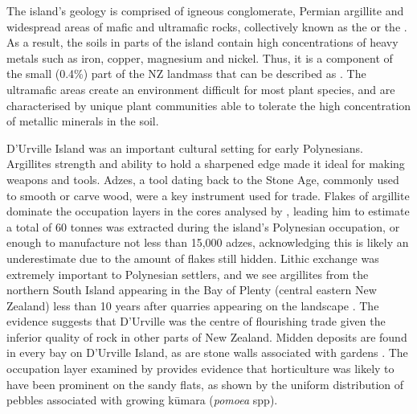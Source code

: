 \documentclass{article}
\begin{document}
The island's geology is comprised of igneous conglomerate, Permian argillite and widespread areas of mafic and ultramafic rocks, collectively known as the  \citep{walls} or the  \citep{lee1992new}.  As a result, the soils in parts of the island contain high concentrations of heavy metals such as iron, copper, magnesium and nickel.  Thus, it is a component of the small (0.4\%) part of the NZ landmass that can be described as  \citep{lee1992new}.  The ultramafic areas create an environment difficult for most plant species, and are characterised by unique plant communities able to tolerate the high concentration of metallic minerals in the soil.  

D'Urville Island was an important cultural setting for early Polynesians.  Argillites strength and ability to hold a sharpened edge made it ideal for making weapons and tools.  Adzes, a tool dating back to the Stone Age, commonly used to smooth or carve wood, were a key instrument used for trade.  Flakes of argillite dominate the occupation layers in the cores analysed by \cite{Wellman1962}, leading him to estimate a total of 60 tonnes was extracted during the island's Polynesian occupation, or enough to manufacture not less than 15,000 adzes, acknowledging this is likely an underestimate due to the amount of flakes still hidden.  Lithic exchange was extremely important to Polynesian settlers, and we see argillites from the northern South Island appearing in the Bay of Plenty (central eastern New Zealand) less than 10 years after quarries appearing on the landscape \citep{walter2010colonisation}.  The evidence suggests that D'Urville was the centre of flourishing trade given the inferior quality of rock in other parts of New Zealand.   Midden deposits are found in every bay on D'Urville Island, as are stone walls associated with gardens \citep{walls}.  The occupation layer examined by \cite{Wellman1962} provides evidence that horticulture was likely to have been prominent on the sandy flats, as shown by the uniform distribution of pebbles associated with growing k\=umara (\textit{pomoea} spp).
\end{document}
